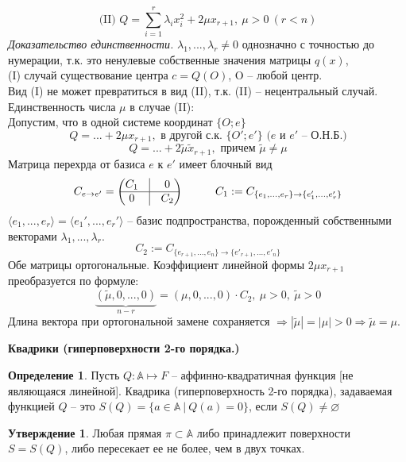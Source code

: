 \documentclass[a4paper, 12pt]{article}
\newcommand\tab[1][.5cm]{\hspace*{#1}}
\theoremstyle{definition}
\newtheorem*{definition}{Определение}
\newtheorem*{subtheorem}{Утверждение}
\begin{document}
    $$\text{(II) } Q = \sum\limits_{i=1}^{r} \lambda_ix_i^2 + 
    2\mu x_{r+1},\ \mu > 0\ (r < n)$$
    \textit{Доказательство единственности.} $\lambda_1,...,
    \lambda_r \neq 0$ однозначно с точностью до нумерации, т.к.
    это ненулевые собственные значения матрицы $q(x)$,\\
    (I) случай существование центра $c = Q(O)$, O -- любой 
    центр.\\
    Вид (I) не может превратиться в вид (II), т.к. (II) -- 
    нецентральный случай.\\
    Единственность числа $\mu$ в случае (II):\\
    Допустим, что в одной системе координат $\{O; e\}$
    $$Q = ... + 2\mu x_{r+1}, \text{ в другой с.к. $\{O';e'\}
    $\ ($e$ и $e'$ -- О.Н.Б.)}$$
    $$Q = ... + 2 \widetilde{\mu} \widetilde{x}_{r+1}, 
    \text{ причем } \widetilde{\mu} \neq \mu$$
    Матрица перехрда от базиса $e$ к $e'$ имеет блочный вид
    $$C_{e \to e'} = \begin{pmatrix}
        C_1 & \vline & 0\\\hline 0 & \vline & C_2
    \end{pmatrix}\tab[1cm]
    C_1 := C_{\{e_1,...,e_r\} \to \{e_1',...,e_r'\}}$$$
    \langle e_1,...,e_r\rangle = \langle e_1',...,e_r'\rangle$
    --  базис подпространства, порожденный собственными 
    векторами $\lambda_1,...,\lambda_r$.
    $$C_2 := C_{\{e_{r+1},...,e_n\} \to \{e'_{r+1},...,e'_n\}}$$
    Обе матрицы ортогональные. Коэффициент линейной формы 
    $2\mu x_{r+1}$ преобразуется по формуле: $$\underbrace{  
    (\widetilde{\mu},
    0,...,0)}_{n - r} = (\mu,0,...,0)\cdot C_2,\ \mu > 0,\ 
    \widetilde{\mu} > 0$$
    Длина вектора при ортогональной замене сохраняется $
    \Longrightarrow |\widetilde{\mu}| = |\mu| > 0 
    \Longrightarrow \widetilde{\mu} = \mu$.
    \begin{center}
        \textbf{Квадрики (гиперповерхности 2-го порядка.)} 
    \end{center}
    \begin{definition}
        Пусть $Q: \mathbb{A} \longmapsto F$ -- 
        аффинно-квадратичная функция [не являющаяся линейной].
        Квадрика (гиперповерхность 2-го порядка), задаваемая
        функцией $Q$ -- это $S(Q) = \{a \in \mathbb{A}\ |\  
        Q(a) = 0\}$, если $S(Q) \neq \varnothing$ 
    \end{definition}
    \begin{subtheorem}
        Любая прямая $\pi \subset \mathbb{A}$ либо принадлежит
        поверхности $S = S(Q)$, либо пересекает ее не более, 
        чем в двух точках. 
    \end{subtheorem}
\end{document}
